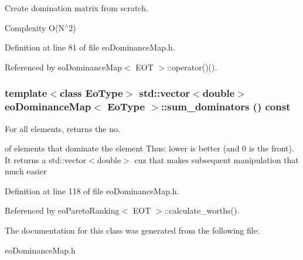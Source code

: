 Create domination matrix from scratch. 

Complexity O(N$^\wedge$2) 

Definition at line 81 of file eo\-Dominance\-Map.h.

Referenced by eo\-Dominance\-Map$<$ EOT $>$::operator()().
\subsubsection{\setlength{\rightskip}{0pt plus 5cm}template$<$class Eo\-Type$>$ std::vector$<$double$>$ {\bf eo\-Dominance\-Map}$<$ {\bf Eo\-Type} $>$::sum\_\-dominators () const\hspace{0.3cm}{\tt  [inline]}}\label{classeo_dominance_map_a4}


For all elements, returns the no. 

of elements that dominate the element Thus: lower is better (and 0 is the front). It returns a std::vector$<$double$>$ cuz that makes subsequent manipulation that much easier 

Definition at line 118 of file eo\-Dominance\-Map.h.

Referenced by eo\-Pareto\-Ranking$<$ EOT $>$::calculate\_\-worths().

The documentation for this class was generated from the following file:\begin{CompactItemize}
\item 
eo\-Dominance\-Map.h\end{CompactItemize}
